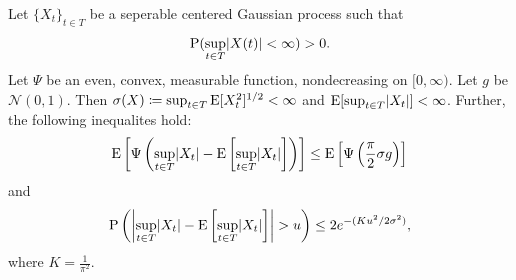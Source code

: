 \begin{proposition}
    \cite[Thm. 2.1.20]{gine2021mathematical}
    Let \( \{ X_{t} \}_{t \in T} \) be a seperable centered Gaussian process such that
    \[
        \mathrm{P}(\sup_{t \in T} \lvert X(t) \rvert < \infty ) > 0.
    \]
    Let $\Psi$ be an even, convex, measurable function, nondecreasing on $[0,\infty)$. Let $g$ be $\mathcal{N}(0,1)$. 
    Then \(\sigma(X) \coloneqq \sup_{t \in T} \operatorname*{E}[X_{t}^2]^{1/2} < \infty\) 
    and \( \operatorname*{E}[\sup_{t \in T} \lvert X_{t} \rvert] < \infty \).
    Further, the following inequalites hold:
    \[
        \operatorname*{E}\left[\Psi \left( \sup_{t \in T} \lvert X_{t}\rvert - \operatorname*{E} \left[\sup_{t \in T} \lvert X_{t}\rvert\right] \right)\right] 
        \leq \operatorname*{E}\left[ \Psi \left( \frac{\pi}{2} \sigma g \right) \right]
    \]
    and
    \[
        \mathrm{P}\left( \left\lvert\sup_{t \in T} \lvert X_{t}\rvert - \operatorname*{E} \left[\sup_{t \in T} \lvert X_{t}\rvert\right]  \right\rvert > u \right)
        \leq 2 e^{-(Ku^2/2\sigma^2)},
    \]
    where \( K = \frac{1}{\pi^2} \).
    
\end{proposition}


    


    
    






